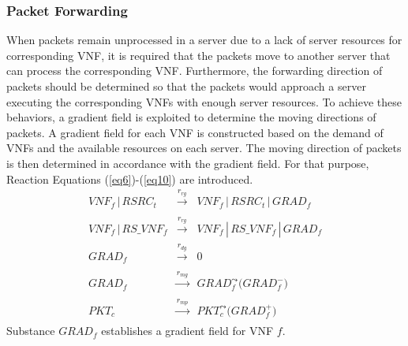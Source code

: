 \documentclass[technicalreport]{ieicej}
\begin{document}
	\subsubsection{Packet Forwarding}
	\label{subsec:grad}
	When packets remain unprocessed in a server due to a lack of server resources for corresponding VNF, it is required that the packets move to another server that can process the corresponding VNF.
	Furthermore, the forwarding direction of packets should be determined so that the packets would approach a server executing the corresponding VNFs with enough server resources.
	To achieve these behaviors, a gradient field is exploited to determine the moving directions of packets.
	A gradient field for each VNF is constructed based on the demand of VNFs and the available resources on each server.
	The moving direction of packets is then determined in accordance with the gradient field.
	For that purpose, Reaction Equations (\ref{eq6})-(\ref{eq10}) are introduced.
	\begin{eqnarray}
	\label{eq6}
	\mathit{VNF_f}\,|\,\mathit{RSRC_t}&\xrightarrow[]{\mathit{r_{rg}}}&\mathit{VNF_f}\,|\,\mathit{RSRC_t}\,|\,\mathit{GRAD_f} \\
	\label{eq7}
	\mathit{VNF_f}\,|\,\mathit{RS\_VNF_f}&\xrightarrow[]{\mathit{r_{rg}}}&\mathit{VNF_f}\,|\,\mathit{RS\_VNF_f}\,|\,\mathit{GRAD_f} \\
	\label{eq8}
	\mathit{GRAD_f} &\xrightarrow[]{\mathit{r_{dg}}}& 0\\
	\label{eq9}
	\mathit{GRAD_f}&\xrightarrow[]{\mathit{r_{mg}}}&\mathit{GRAD_f^\leadsto(\mathit{GRAD_f^-)}}\\
	\label{eq10}
	\mathit{PKT_c}&\xrightarrow[]{\mathit{r_{mp}}}&\mathit{PKT_c^\leadsto(\mathit{GRAD_{f}^+)}}
	\end{eqnarray}
	Substance $\mathit{GRAD_f}$ establishes a gradient field for VNF $f$.
\end{document}
